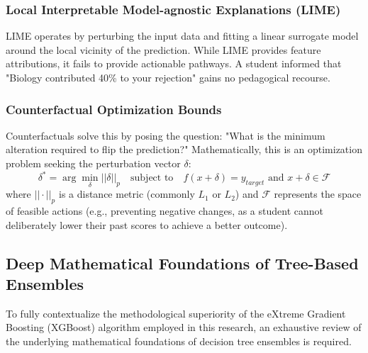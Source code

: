 \subsubsection{Local Interpretable Model-agnostic Explanations (LIME)}
LIME operates by perturbing the input data and fitting a linear surrogate model around the local vicinity of the prediction. While LIME \parencite{lundberg2017unified} provides feature attributions, it fails to provide actionable pathways. A student informed that "Biology contributed 40\% to your rejection" gains no pedagogical recourse.

\subsubsection{Counterfactual Optimization Bounds}
Counterfactuals solve this by posing the question: "What is the minimum alteration required to flip the prediction?" Mathematically, this is an optimization problem seeking the perturbation vector $\delta$:
\begin{equation}
    \delta^* = \arg \min_{\delta} || \delta ||_p \quad \text{subject to} \quad f(x + \delta) = y_{target} \text{ and } x+\delta \in \mathcal{F}
\end{equation}
where $|| \cdot ||_p$ is a distance metric (commonly $L_1$ or $L_2$) and $\mathcal{F}$ represents the space of feasible actions (e.g., preventing negative changes, as a student cannot deliberately lower their past scores to achieve a better outcome).





\subsection{Deep Mathematical Foundations of Tree-Based Ensembles}

To fully contextualize the methodological superiority of the eXtreme Gradient Boosting (XGBoost) algorithm employed in this research, an exhaustive review of the underlying mathematical foundations of decision tree ensembles is required. 

